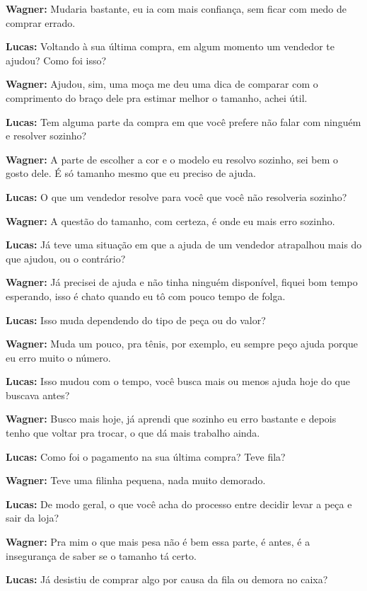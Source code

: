 \textbf{Wagner:} Mudaria bastante, eu ia com mais confiança, sem ficar com medo de comprar errado.

\textbf{Lucas:} Voltando à sua última compra, em algum momento um vendedor te ajudou? Como foi isso?

\textbf{Wagner:} Ajudou, sim, uma moça me deu uma dica de comparar com o comprimento do braço dele pra estimar melhor o tamanho, achei útil.

\textbf{Lucas:} Tem alguma parte da compra em que você prefere não falar com ninguém e resolver sozinho?

\textbf{Wagner:} A parte de escolher a cor e o modelo eu resolvo sozinho, sei bem o gosto dele. É só tamanho mesmo que eu preciso de ajuda.

\textbf{Lucas:} O que um vendedor resolve para você que você não resolveria sozinho?

\textbf{Wagner:} A questão do tamanho, com certeza, é onde eu mais erro sozinho.

\textbf{Lucas:} Já teve uma situação em que a ajuda de um vendedor atrapalhou mais do que ajudou, ou o contrário?

\textbf{Wagner:} Já precisei de ajuda e não tinha ninguém disponível, fiquei bom tempo esperando, isso é chato quando eu tô com pouco tempo de folga.

\textbf{Lucas:} Isso muda dependendo do tipo de peça ou do valor?

\textbf{Wagner:} Muda um pouco, pra tênis, por exemplo, eu sempre peço ajuda porque eu erro muito o número.

\textbf{Lucas:} Isso mudou com o tempo, você busca mais ou menos ajuda hoje do que buscava antes?

\textbf{Wagner:} Busco mais hoje, já aprendi que sozinho eu erro bastante e depois tenho que voltar pra trocar, o que dá mais trabalho ainda.

\textbf{Lucas:} Como foi o pagamento na sua última compra? Teve fila?

\textbf{Wagner:} Teve uma filinha pequena, nada muito demorado.

\textbf{Lucas:} De modo geral, o que você acha do processo entre decidir levar a peça e sair da loja?

\textbf{Wagner:} Pra mim o que mais pesa não é bem essa parte, é antes, é a insegurança de saber se o tamanho tá certo.

\textbf{Lucas:} Já desistiu de comprar algo por causa da fila ou demora no caixa?

